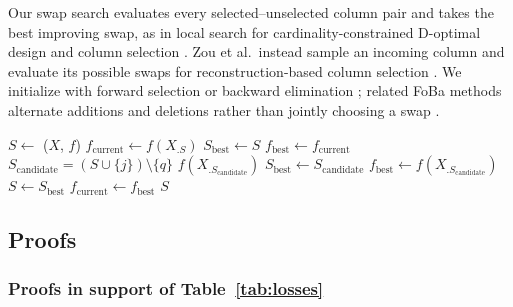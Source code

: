 Our swap search evaluates every selected--unselected column pair and takes the best improving swap, as in local search for cardinality-constrained D-optimal design \citep{Fedorov1972-optimal,Wang2025-doptimal} and column selection \citep{Gu1996-strong-rrqr}.
Zou et al.\ instead sample an incoming column and evaluate its possible swaps for reconstruction-based column selection \citep{Zou2024-swap}.
We initialize with forward selection or backward elimination \citep{Mao2004-forward-backward}; related FoBa methods alternate additions and deletions rather than jointly choosing a swap \citep{Zhang2008-foba,pmlr-v32-liub14}.

\begin{algorithm}[H]
\caption{\forwardbackward(Matrix ${X} \in \mathbb{R}^{D \times P}$, objective $f$)}
\begin{algorithmic}[1]
 $S \leftarrow$ \greedy(${X}$, $f$)
 $f_{\text{current}} \leftarrow f({X}_{.S})$
     $S_{\text{best}} \leftarrow S$
     $f_{\text{best}} \leftarrow f_{\text{current}}$
             $S_{\text{candidate}} = (S \cup \{j\}) \setminus \{q\}$
             $f({X}_{.S_{\text{candidate}}})$
                 $S_{\text{best}} \leftarrow S_{\text{candidate}}$
                 $f_{\text{best}} \leftarrow f({X}_{.S_{\text{candidate}}})$
            \ENDIF
        \ENDFOR
    \ENDFOR
    \ENDIF
     $S \leftarrow S_{\text{best}}$
     $f_{\text{current}} \leftarrow f_{\text{best}}$
\ENDFOR
{} $S$
\end{algorithmic}
\end{algorithm}

\subsection{Proofs}
\label{sec:proofs}

\subsubsection{Proofs in support of Table~\ref{tab:losses}}
\label{sec:table1_proofs}

